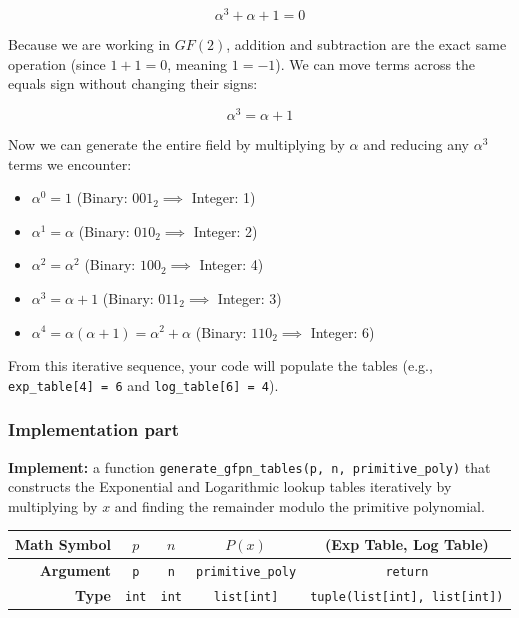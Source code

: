 \documentclass[11pt]{article}
\begin{document}
$$\alpha^3 + \alpha + 1 = 0$$


Because we are working in $GF(2)$, addition and subtraction are the exact same operation (since $1 + 1 = 0$, meaning $1 = -1$). We can move terms across the equals sign without changing their signs:


$$\alpha^3 = \alpha + 1$$


Now we can generate the entire field by multiplying by $\alpha$ and reducing any $\alpha^3$ terms we encounter:
\begin{itemize}
\item $\alpha^0 = 1$ \hfill (Binary: $001_2 \implies$ Integer: 1)
\item $\alpha^1 = \alpha$ \hfill (Binary: $010_2 \implies$ Integer: 2)
\item $\alpha^2 = \alpha^2$ \hfill (Binary: $100_2 \implies$ Integer: 4)
\item $\alpha^3 = \alpha + 1$ \hfill (Binary: $011_2 \implies$ Integer: 3)
\item $\alpha^4 = \alpha(\alpha + 1) = \alpha^2 + \alpha$ \hfill (Binary: $110_2 \implies$ Integer: 6)
\end{itemize}
From this iterative sequence, your code will populate the tables (e.g., \lstinline|exp_table[4] = 6| and \lstinline|log_table[6] = 4|).

\subsubsection*{Implementation part}
\textbf{Implement:} a function \lstinline|generate_gfpn_tables(p, n, primitive_poly)| that constructs the Exponential and Logarithmic lookup tables iteratively by multiplying by $x$ and finding the remainder modulo the primitive polynomial.

\begin{center}
\renewcommand{\arraystretch}{2.0}
\begin{tabular}{r | c | c | c | c}
\toprule
\textbf{Math Symbol} & $p$ & $n$ & $P(x)$ & (Exp Table, Log Table)\\ \midrule
\textbf{Argument} & \lstinline|p| & \lstinline|n| & \lstinline|primitive_poly| & \lstinline|return| \\ \midrule
\textbf{Type} & \lstinline|int| & \lstinline|int| & \lstinline|list[int]| & \lstinline|tuple(list[int], list[int])| \\
\bottomrule
\end{tabular}
\end{center}
\end{document}
